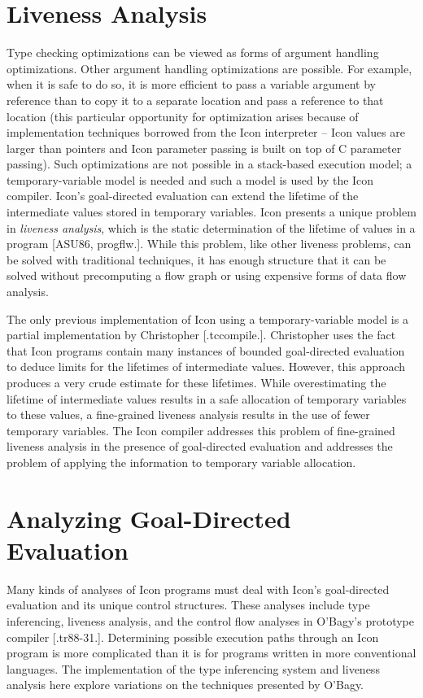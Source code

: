 \section{Liveness Analysis}

Type checking optimizations can be viewed as forms of argument
handling optimizations. Other argument handling optimizations are
possible. For example, when it is safe to do so, it is more efficient
to pass a variable argument by reference than to copy it to a separate
location and pass a reference to that location (this particular
opportunity for optimization arises because of implementation
techniques borrowed from the Icon interpreter -- Icon values are
larger than pointers and Icon parameter passing is built on top of C
parameter passing). Such optimizations are not possible in a
stack-based execution model; a temporary-variable model is needed and
such a model is used by the Icon compiler.  Icon's goal-directed
evaluation can extend the lifetime of the intermediate values stored
in temporary variables. Icon presents a unique problem in
\textit{liveness analysis}, which is the static determination of the
lifetime of values in a program [ASU86, progflw.]. While this problem,
like other liveness problems, can be solved with traditional
techniques, it has enough structure that it can be solved without
precomputing a flow graph or using expensive forms of data flow
analysis.


The only previous implementation of Icon using a temporary-variable
model is a partial implementation by Christopher
[.tccompile.]. Christopher uses the fact that Icon programs contain
many instances of bounded goal-directed evaluation to deduce limits
for the lifetimes of intermediate values. However, this approach
produces a very crude estimate for these lifetimes. While
overestimating the lifetime of intermediate values results in a safe
allocation of temporary variables to these values, a fine-grained
liveness analysis results in the use of fewer temporary variables. The
Icon compiler addresses this problem of fine-grained liveness analysis
in the presence of goal-directed evaluation and addresses the problem
of applying the information to temporary variable allocation.

\section{Analyzing Goal-Directed Evaluation}

Many kinds of analyses of Icon programs must deal with Icon's
goal-directed evaluation and its unique control structures. These
analyses include type inferencing, liveness analysis, and the control
flow analyses in O'Bagy's prototype compiler [.tr88-31.]. Determining
possible execution paths through an Icon program is more complicated
than it is for programs written in more conventional languages. The
implementation of the type inferencing system and liveness analysis
here explore variations on the techniques presented by O'Bagy.

